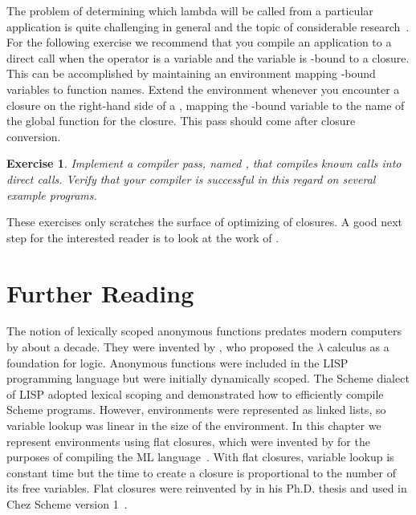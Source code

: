 \documentclass[11pt]{book}
\newtheorem{exercise}[theorem]{Exercise}
\begin{document}
The problem of determining which lambda will be called from a
particular application is quite challenging in general and the topic
of considerable research~\citep{Shivers:1988aa,Gilray:2016aa}. For the
following exercise we recommend that you compile an application to a
direct call when the operator is a variable and the variable is
-bound to a closure. This can be accomplished by maintaining
an environment mapping -bound variables to function names.
Extend the environment whenever you encounter a closure on the
right-hand side of a , mapping the -bound variable
to the name of the global function for the closure.  This pass should
come after closure conversion.

\begin{exercise}\normalfont
Implement a compiler pass, named , that
compiles known calls into direct calls. Verify that your compiler is
successful in this regard on several example programs.
\end{exercise}

These exercises only scratches the surface of optimizing of
closures. A good next step for the interested reader is to look at the
work of \citet{Keep:2012ab}.

\section{Further Reading}

The notion of lexically scoped anonymous functions predates modern
computers by about a decade. They were invented by
\citet{Church:1932aa}, who proposed the $\lambda$ calculus as a
foundation for logic. Anonymous functions were included in the
LISP~\citep{McCarthy:1960dz} programming language but were initially
dynamically scoped. The Scheme dialect of LISP adopted lexical scoping
and \citet{Guy-L.-Steele:1978yq} demonstrated how to efficiently
compile Scheme programs. However, environments were represented as
linked lists, so variable lookup was linear in the size of the
environment. In this chapter we represent environments using flat
closures, which were invented by
\citet{Cardelli:1983aa,Cardelli:1984aa} for the purposes of compiling
the ML language~\citep{Gordon:1978aa,Milner:1990fk}. With flat
closures, variable lookup is constant time but the time to create a
closure is proportional to the number of its free variables.  Flat
closures were reinvented by \citet{Dybvig:1987ab} in his Ph.D. thesis
and used in Chez Scheme version 1~\citep{Dybvig:2006aa}.
\end{document}
